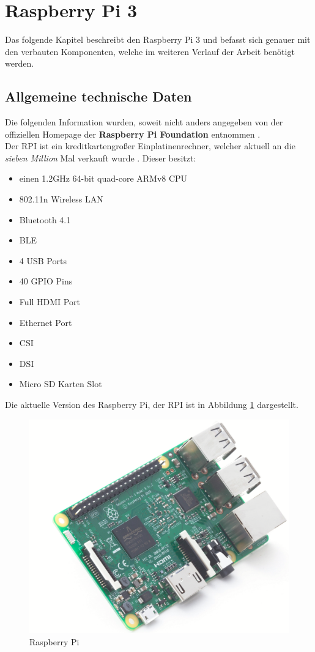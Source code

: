 \section{Raspberry Pi 3}
\label{section_Raspberry_Pi3}
Das folgende Kapitel beschreibt den Raspberry Pi 3 und befasst sich genauer mit den verbauten Komponenten, welche im weiteren Verlauf der Arbeit benötigt werden. 

\subsection{Allgemeine technische Daten}
\label{subsection_Allgemeine_technische_Daten}
Die folgenden Information wurden, soweit nicht anders angegeben von der offiziellen Homepage der \textbf{Raspberry Pi Foundation} entnommen \citep{RaspberryPiHomePage}.\\
Der \ac{RPI} ist ein kreditkartengroßer Einplatinenrechner, welcher aktuell an die \textit{sieben Million} Mal verkauft wurde \citep{RPI_Verkaufszahlen}. Dieser besitzt:
\begin{itemize}
\item einen 1.2\;GHz 64-bit quad-core ARMv8 CPU
\item 802.11n Wireless LAN
\item Bluetooth 4.1
\item \ac{BLE}
\item 4 USB Ports
\item 40 GPIO Pins
\item Full HDMI Port
\item Ethernet Port
\item \ac{CSI}
\item \ac{DSI}
\item Micro SD Karten Slot
\end{itemize}

Die aktuelle Version des Raspberry Pi, der \ac{RPI} ist in Abbildung \ref{Abb_Bild_RPI3} dargestellt.

\begin{figure}[!h] 
  \centering
     \includegraphics[scale=.4]{BilderAllgemein/RPI3.png}
  \caption{Raspberry Pi \citep{RPI_Bild}}
  \label{Abb_Bild_RPI3}
\end{figure}

